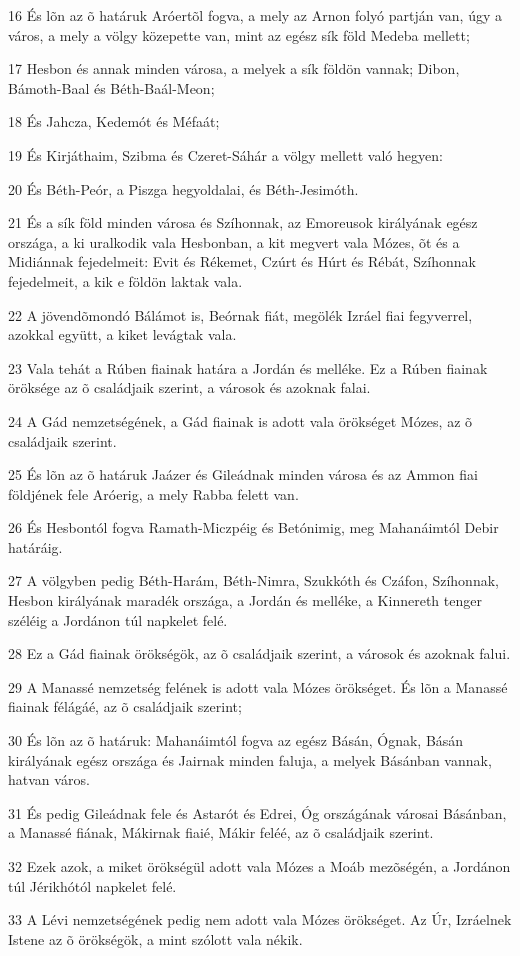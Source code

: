 \par 16 És lõn az õ határuk Aróertõl fogva, a mely az Arnon folyó partján van, úgy a város, a mely a völgy közepette van, mint az egész sík föld Medeba mellett;
\par 17 Hesbon és annak minden városa, a melyek a sík földön vannak; Dibon, Bámoth-Baal és Béth-Baál-Meon;
\par 18 És Jahcza, Kedemót és Méfaát;
\par 19 És Kirjáthaim, Szibma és Czeret-Sáhár a völgy mellett való hegyen:
\par 20 És Béth-Peór, a Piszga hegyoldalai, és Béth-Jesimóth.
\par 21 És a sík föld minden városa és Szíhonnak, az Emoreusok királyának egész országa, a ki uralkodik vala Hesbonban, a kit megvert vala Mózes, õt és a Midiánnak fejedelmeit: Evit és Rékemet, Czúrt és Húrt és Rébát, Szíhonnak fejedelmeit, a kik e földön laktak vala.
\par 22 A jövendõmondó Bálámot is, Beórnak fiát, megölék Izráel fiai fegyverrel, azokkal együtt, a kiket levágtak vala.
\par 23 Vala tehát a Rúben fiainak határa a Jordán és melléke. Ez a Rúben fiainak öröksége az õ családjaik szerint, a városok és azoknak falai.
\par 24 A Gád nemzetségének, a Gád fiainak is adott vala örökséget Mózes, az õ családjaik szerint.
\par 25 És lõn az õ határuk Jaázer és Gileádnak minden városa és az Ammon fiai földjének fele Aróerig, a mely Rabba felett van.
\par 26 És Hesbontól fogva Ramath-Miczpéig és Betónimig, meg Mahanáimtól Debir határáig.
\par 27 A völgyben pedig Béth-Harám, Béth-Nimra, Szukkóth és Czáfon, Szíhonnak, Hesbon királyának maradék országa, a Jordán és melléke, a Kinnereth tenger széléig a Jordánon túl napkelet felé.
\par 28 Ez a Gád fiainak örökségök, az õ családjaik szerint, a városok és azoknak falui.
\par 29 A Manassé nemzetség felének is adott vala Mózes örökséget. És lõn a Manassé fiainak félágáé, az õ családjaik szerint;
\par 30 És lõn az õ határuk: Mahanáimtól fogva az egész Básán, Ógnak, Básán királyának egész országa és Jairnak minden faluja, a melyek Básánban vannak, hatvan város.
\par 31 És pedig Gileádnak fele és Astarót és Edrei, Óg országának városai Básánban, a Manassé fiának, Mákirnak fiaié, Mákir feléé, az õ családjaik szerint.
\par 32 Ezek azok, a miket örökségül adott vala Mózes a Moáb mezõségén, a Jordánon túl Jérikhótól napkelet felé.
\par 33 A Lévi nemzetségének pedig nem adott vala Mózes örökséget. Az Úr, Izráelnek Istene az õ örökségök, a mint szólott vala nékik.

